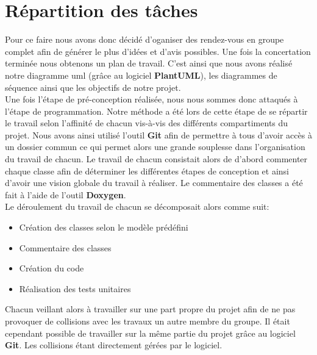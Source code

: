\chapter{Répartition des tâches}
    Pour ce faire nous avons donc décidé d'oganiser des rendez-vous en groupe complet 
    afin de générer le plus d'idées et d'avis possibles. Une fois la concertation 
    terminée nous obtenons un plan de travail. C'est ainsi que nous avons réalisé notre 
    diagramme uml (grâce au logiciel \textbf{PlantUML}), les diagrammes de séquence ainsi que les objectifs de notre projet.\\

    Une fois l'étape de pré-conception réalisée, nous nous sommes donc attaqués à l'étape de 
    programmation. Notre méthode a été lors de cette étape de se répartir le travail 
    selon l'affinité de chacun vis-à-vis des différents compartiments du projet. Nous 
    avons ainsi utilisé l'outil \textbf{Git} afin de permettre à tous d'avoir accès à un dossier 
    commun ce qui permet alors une grande souplesse dans l'organisation du travail de 
    chacun. Le travail de chacun consistait alors de d'abord commenter chaque classe 
    afin de déterminer les différentes étapes de conception et ainsi d'avoir une vision 
    globale du travail à réaliser. Le commentaire des classes a été fait à l'aide de 
    l'outil \textbf{Doxygen}.\\

    \renewcommand{\labelitemi}{$\rightarrow$}
    Le déroulement du travail de chacun se décomposait alors comme suit:
    \begin{itemize}
        \item Création des classes selon le modèle prédéfini
        \item Commentaire des classes
        \item Création du code
        \item Réalisation des tests unitaires\\
    \end{itemize}

    Chacun veillant alors à travailler sur une part propre du projet afin de ne pas 
    provoquer de collisions avec les travaux un autre membre du groupe. Il était cependant possible de 
    travailler sur la même partie du projet grâce au logiciel \textbf{Git}. Les collisions étant 
    directement gérées par le logiciel.\\
